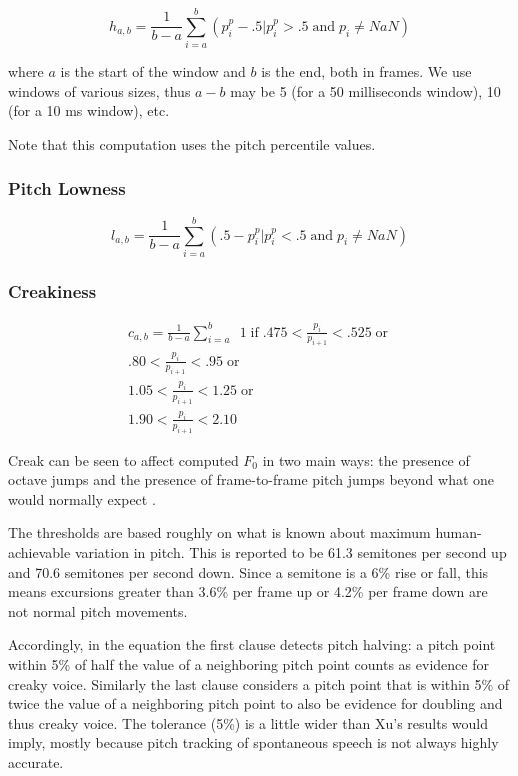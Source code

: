 \documentclass[11pt]{article}
\begin{document}
\begin{equation}
h_{a,b} = \frac{1}{b-a} \sum\limits_{i=a}^b (p_i^p -.5 | p_i^p> .5 \operatorname{and} p_i \neq NaN)
\end{equation}

where $a$ is the start of the window and $b$ is the end, both in
frames.  We use windows of various sizes, thus $a-b$ may be 5 (for a
50 milliseconds window), 10 (for a 10 ms window), etc.

Note that this computation uses the pitch
percentile values.



\subsubsection{Pitch Lowness}

\begin{equation}
l_{a,b} = \frac{1}{b-a} \sum\limits_{i=a}^b ( .5 - p_i^p | p_i^p < .5 \operatorname{and} p_i \neq NaN)
\end{equation}

\subsubsection{Creakiness}

\begin{multline}
c_{a,b} = \frac{1}{b-a} \sum\limits_{i=a}^b \enspace 1 \operatorname{if}  .475 < \frac{p_i}{p_{i+1}} < .525 \operatorname{or} \\  .80 < \frac{p_i}{ p_{i+1}} < .95  \operatorname{or} \\ 1.05 < \frac{p_i}{ p_{i+1}} < 1.25 \operatorname{or} \\ 1.90 < \frac{p_i}{ p_{i+1}} < 2.10
\end{multline}

Creak can be seen to affect computed $F_0$ in two main ways: the
presence of octave jumps and the presence of frame-to-frame pitch
jumps beyond what one would normally expect \cite{keating15}.

The thresholds are based roughly on what is known about maximum
human-achievable variation in pitch.  This is reported to be 61.3
semitones per second up and 70.6 semitones per second
down\cite{xu02-pitch-change-rate}.  Since a semitone is a 6\% rise or
fall, this means excursions greater than 3.6\% per frame up or
4.2\% per frame down are not normal pitch movements. 

Accordingly, in the equation the first clause detects pitch halving: a
pitch point within 5\% of half the value of a neighboring pitch point
counts as evidence for creaky voice.  Similarly the last clause
considers a pitch point that is within 5\% of twice the value of a
neighboring pitch point to also be evidence for doubling and thus
creaky voice.  The tolerance (5\%) is a little wider than Xu's results
would imply, mostly because pitch tracking of spontaneous speech is
not always highly accurate.
\end{document}
